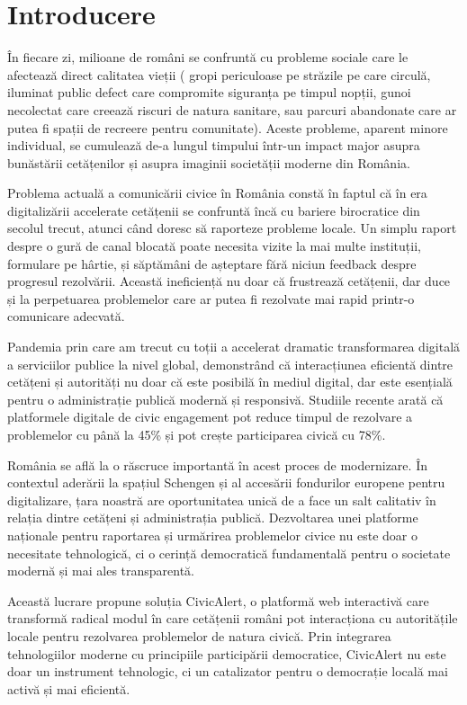 \documentclass[12pt,a4paper]{report}
\begin{document}
\chapter*{Introducere}

În fiecare zi, milioane de români se confruntă cu probleme sociale care le afectează direct calitatea vieții ( gropi periculoase pe străzile pe care circulă, iluminat public defect care compromite siguranța pe timpul nopții, gunoi necolectat care creează riscuri de natura sanitare, sau parcuri abandonate care ar putea fi spații de recreere pentru comunitate). Aceste probleme, aparent minore individual, se cumulează de-a lungul timpului  într-un impact major asupra bunăstării cetățenilor și asupra imaginii societății  moderne din România.

Problema actuală a  comunicării civice în România constă în faptul că în era digitalizării accelerate cetățenii se confruntă încă cu bariere birocratice din secolul trecut, atunci când doresc să raporteze probleme locale. Un simplu raport despre o gură de canal blocată poate necesita vizite la mai multe  instituții, formulare pe hârtie, și săptămâni de așteptare fără niciun feedback despre progresul rezolvării. Această ineficiență nu doar că frustrează cetățenii, dar duce și la perpetuarea problemelor care ar putea fi rezolvate mai rapid printr-o comunicare adecvată.

Pandemia prin care am trecut cu toții  a accelerat dramatic transformarea digitală a serviciilor publice la nivel global, demonstrând că interacțiunea eficientă dintre cetățeni și autorități nu doar că este posibilă în mediul digital, dar este esențială pentru o administrație publică modernă și responsivă. Studiile recente arată că platformele digitale de civic engagement pot reduce timpul de rezolvare a problemelor cu până la 45\% și pot crește participarea civică cu 78\%.

România se află la o răscruce importantă în acest proces de modernizare. În contextul aderării la spațiul Schengen și al accesării fondurilor europene pentru digitalizare, țara noastră are oportunitatea unică de a face un salt calitativ în relația dintre cetățeni și administrația publică. Dezvoltarea unei platforme naționale pentru raportarea și urmărirea problemelor civice nu este doar o necesitate tehnologică, ci o cerință democratică fundamentală pentru o societate modernă și mai ales transparentă.

Această lucrare  propune soluția CivicAlert, o platformă web interactivă care transformă radical modul în care cetățenii români pot interacționa cu autoritățile locale pentru rezolvarea problemelor de natura civică. Prin integrarea tehnologiilor moderne cu principiile participării democratice, CivicAlert nu este doar un instrument tehnologic, ci un catalizator pentru o democrație locală mai activă și mai eficientă.
\end{document}
